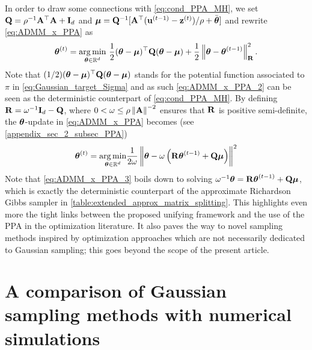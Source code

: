 \documentclass[nohypdvips,onefignum,onetabnum]{siamart171218}
\begin{document}
In order to draw some connections with \eqref{eq:cond_PPA_MH}, we set $\mathbf{Q} = \rho^{-1}\mathbf{A}^{\top}\mathbf{A} + \mathbf{I}_d$ and $\boldsymbol{\mu} = \mathbf{Q}^{-1}[\mathbf{A}^{\top}(\mathbf{u}^{(t-1)} - \mathbf{z}^{(t)})/\rho + \bar{\boldsymbol{\theta}}]$ and rewrite \eqref{eq:ADMM_x_PPA} as 
\begin{equation}
  \Bs{\theta}^{(t)} = \underset{\Bs{\theta}\in\mathbb{R}^d}{\arg \min}\ \dfrac{1}{2}(\Bs{\theta}-\Bs{\mu})^{\top}\B{Q}(\Bs{\theta}-\Bs{\mu}) + \dfrac{1}{2}\nr{\Bs{\theta}-\Bs{\theta}^{(t-1)}}^2_{\B{R}} \label{eq:ADMM_x_PPA_2}.
\end{equation}
Note that $(1/2)(\boldsymbol{\theta}-\boldsymbol{\mu})^{\top}\mathbf{Q}(\boldsymbol{\theta}-\boldsymbol{\mu})$ stands for the potential function associated to $\pi$ in \eqref{eq:Gaussian_target_Sigma} and as such \eqref{eq:ADMM_x_PPA_2} can be seen as the deterministic counterpart of \eqref{eq:cond_PPA_MH}.
By defining $\mathbf{R} = \omega^{-1}\mathbf{I}_d - \mathbf{Q}$, where $0<\omega \leq \rho\left\|\mathbf{A}\right\|^{-2}$ ensures that $\mathbf{R}$ is positive semi-definite, the $\boldsymbol{\theta}$-update in \cref{eq:ADMM_x_PPA} becomes (see \cref{appendix_sec_2_subsec_PPA})
\begin{equation}
  \Bs{\theta}^{(t)} = \underset{\Bs{\theta}\in\mathbb{R}^d}{\arg \min} \dfrac{1}{2\omega}\nr{\Bs{\theta} -  \omega \pr{\B{R}\Bs{\theta}^{(t-1)} + \B{Q}\Bs{\mu}}}^2%
  \label{eq:ADMM_x_PPA_3}
\end{equation}
Note that \eqref{eq:ADMM_x_PPA_3} boils down to solving $\omega^{-1}\boldsymbol{\theta} = \mathbf{R}\boldsymbol{\theta}^{(t-1)} + \mathbf{Q}\boldsymbol{\mu}$,
which is exactly the deterministic counterpart of the approximate Richardson Gibbs sampler in \cref{table:extended_approx_matrix_splitting}.
This highlights even more the tight links between the proposed unifying framework and the use of the PPA in the optimization literature.
It also paves the way to novel sampling methods inspired by optimization approaches which are not necessarily dedicated to Gaussian sampling; this goes beyond the scope of the present article.

\section{A comparison of Gaussian sampling methods with numerical simulations}
\label{sec:applications}
\end{document}
